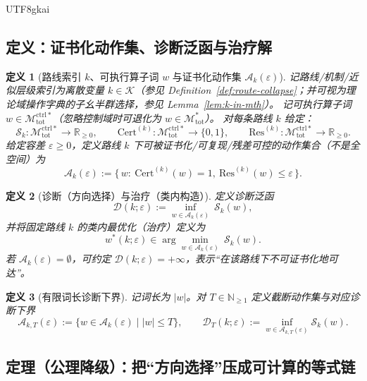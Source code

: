 \documentclass[12pt]{article}
\newtheorem{definition}{定义}[section]
\begin{document}
\begin{CJK*}{UTF8}{gkai}
\subsection{定义：证书化动作集、诊断泛函与治疗解}

\begin{definition}[路线索引 $k$、可执行算子词 $w$ 与证书化动作集 $\mathcal{A}_k(\varepsilon)$]
\label{def:certified-action-set}
记路线/机制/近似层级索引为离散变量 $k\in\mathcal{K}$（参见 Definition~\ref{def:route-collapse}；并可视为理论域操作字典的子幺半群选择，参见 Lemma~\ref{lem:k-in-mth}）。
记可执行算子词 $w\in \mathcal{M}_{\mathrm{tot}}^{\mathrm{ctrl}\ast}$（忽略控制域时可退化为 $w\in\mathcal{M}_{\mathrm{tot}}^{\ast}$）。
对每条路线 $k$ 给定：
\[
\mathcal{S}_k:\mathcal{M}_{\mathrm{tot}}^{\mathrm{ctrl}\ast}\to\mathbb{R}_{\ge 0},\qquad
\mathrm{Cert}^{(k)}:\mathcal{M}_{\mathrm{tot}}^{\mathrm{ctrl}\ast}\to\{0,1\},\qquad
\mathrm{Res}^{(k)}:\mathcal{M}_{\mathrm{tot}}^{\mathrm{ctrl}\ast}\to\mathbb{R}_{\ge 0}.
\]
给定容差 $\varepsilon\ge 0$，定义路线 $k$ 下可被证书化/可复现/残差可控的动作集合（不是全空间）为
\[
\mathcal{A}_k(\varepsilon)
:=
\{\,w:\ \mathrm{Cert}^{(k)}(w)=1,\ \mathrm{Res}^{(k)}(w)\le \varepsilon\,\}.
\]
\end{definition}

\begin{definition}[诊断（方向选择）与治疗（类内构造）]
\label{def:diagnosis-and-treatment}
定义诊断泛函
\[
\mathcal{D}(k;\varepsilon)
:=
\inf_{w\in \mathcal{A}_k(\varepsilon)}\ \mathcal{S}_k(w),
\]
并将固定路线 $k$ 的类内最优化（治疗）定义为
\[
w^\ast(k;\varepsilon)\in \arg\min_{w\in \mathcal{A}_k(\varepsilon)}\ \mathcal{S}_k(w).
\]
若 $\mathcal{A}_k(\varepsilon)=\emptyset$，可约定 $\mathcal{D}(k;\varepsilon)=+\infty$，表示“在该路线下不可证书化地可达”。
\end{definition}

\begin{definition}[有限词长诊断下界]
\label{def:truncated-diagnosis}
记词长为 $|w|$。对 $T\in\mathbb{N}_{\ge 1}$ 定义截断动作集与对应诊断下界
\[
\mathcal{A}_{k,T}(\varepsilon):=\{w\in\mathcal{A}_k(\varepsilon)\mid |w|\le T\},
\qquad
\mathcal{D}_T(k;\varepsilon):=\inf_{w\in \mathcal{A}_{k,T}(\varepsilon)} \mathcal{S}_k(w).
\]
\end{definition}

\subsection{定理（公理降级）：把“方向选择”压成可计算的等式链}


\end{CJK*}
\end{document}
